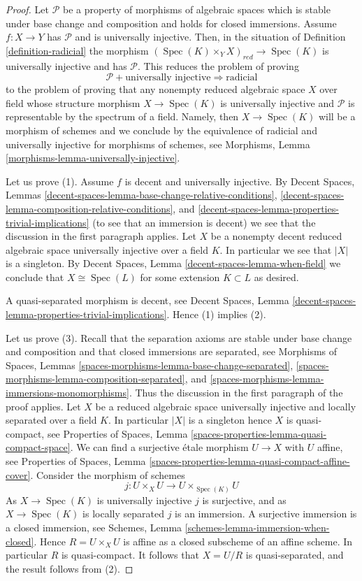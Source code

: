 \documentclass[10pt,a4paper]{amsart}
\theoremstyle{plain}
\theoremstyle{definition}
\theoremstyle{remark}
\numberwithin{equation}{subsection}
\def\Spec{\mathop{\mathrm{Spec}}}
\begin{document}
\begin{proof}
Let $\mathcal{P}$ be a property of morphisms of algebraic spaces
which is stable under base change and composition and holds for
closed immersions. Assume $f : X \to Y$ has $\mathcal{P}$ and
is universally injective. Then, in the situation of
Definition \ref{definition-radicial}
the morphism $(\Spec(K) \times_Y X)_{red} \to \Spec(K)$
is universally injective and has $\mathcal{P}$. This reduces the
problem of proving
$$
\mathcal{P} + \text{universally injective}
\Rightarrow
\text{radicial}
$$
to the problem of proving that any nonempty reduced algebraic space $X$
over field whose structure morphism $X \to \Spec(K)$ is universally
injective and $\mathcal{P}$ is representable by the spectrum of a field.
Namely, then $X \to \Spec(K)$ will be a morphism of schemes and
we conclude by the equivalence of radicial and universally injective for
morphisms of schemes, see
Morphisms, Lemma \ref{morphisms-lemma-universally-injective}.

\medskip\noindent
Let us prove (1). Assume $f$ is decent and universally injective. By
Decent Spaces,
Lemmas \ref{decent-spaces-lemma-base-change-relative-conditions},
\ref{decent-spaces-lemma-composition-relative-conditions}, and
\ref{decent-spaces-lemma-properties-trivial-implications}
(to see that an immersion is decent) we see that the discussion in
the first paragraph applies.
Let $X$ be a nonempty decent reduced algebraic space
universally injective over a field $K$. In particular we see that $|X|$
is a singleton. By
Decent Spaces, Lemma \ref{decent-spaces-lemma-when-field}
we conclude that $X \cong \Spec(L)$ for some extension
$K \subset L$ as desired.

\medskip\noindent
A quasi-separated morphism is decent, see
Decent Spaces,
Lemma \ref{decent-spaces-lemma-properties-trivial-implications}.
Hence (1) implies (2).

\medskip\noindent
Let us prove (3).
Recall that the separation axioms are stable under base change
and composition and that closed immersions are separated, see
Morphisms of Spaces,
Lemmas \ref{spaces-morphisms-lemma-base-change-separated},
\ref{spaces-morphisms-lemma-composition-separated}, and
\ref{spaces-morphisms-lemma-immersions-monomorphisms}.
Thus the discussion in the first paragraph of the proof applies.
Let $X$ be a reduced algebraic space universally injective and
locally separated over a field $K$.
In particular $|X|$ is a singleton hence $X$ is quasi-compact, see
Properties of Spaces, Lemma \ref{spaces-properties-lemma-quasi-compact-space}.
We can find a surjective \'etale morphism $U \to X$ with $U$ affine, see
Properties of Spaces,
Lemma \ref{spaces-properties-lemma-quasi-compact-affine-cover}.
Consider the morphism of schemes
$$
j :
U \times_X U
\longrightarrow
U \times_{\Spec(K)} U
$$
As $X \to \Spec(K)$ is universally injective $j$ is surjective,
and as $X \to \Spec(K)$ is locally separated $j$ is an immersion.
A surjective immersion is a closed immersion, see
Schemes, Lemma \ref{schemes-lemma-immersion-when-closed}.
Hence $R = U \times_X U$ is affine as a closed subscheme of an affine scheme.
In particular $R$ is quasi-compact.
It follows that $X = U/R$ is quasi-separated, and the result follows from (2).
\end{proof}
\end{document}
